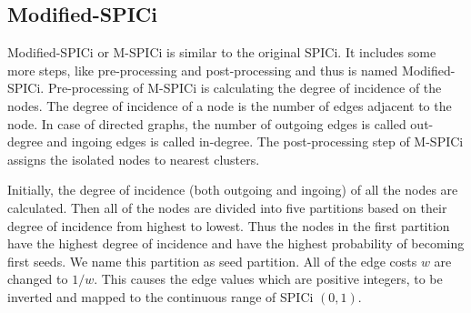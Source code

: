 \documentclass[times]{dacauth}
\begin{document}
\subsection{Modified-SPICi}
Modified-SPICi or M-SPICi is similar to the original SPICi. It includes some more steps, like pre-processing and post-processing and thus is named Modified-SPICi. Pre-processing of M-SPICi is calculating the degree of incidence of the nodes. The degree of incidence of a node is the number of edges adjacent to the node. In case of directed graphs, the number of outgoing edges is called out-degree and ingoing edges is called in-degree. The post-processing step of M-SPICi assigns the isolated nodes to nearest clusters.


\smallskip
Initially, the degree of incidence (both outgoing and ingoing) of all the nodes are calculated. Then all of the nodes are divided into five partitions based on their degree of incidence from highest to lowest. Thus the nodes in the first partition have the highest degree of incidence and have the highest probability of becoming first seeds. We name this partition as seed partition.
All of the edge costs $w$ are changed to $1/w$. This causes the edge values which are positive integers, to be inverted and mapped to the continuous range of SPICi $(0,1)$.
\end{document}
